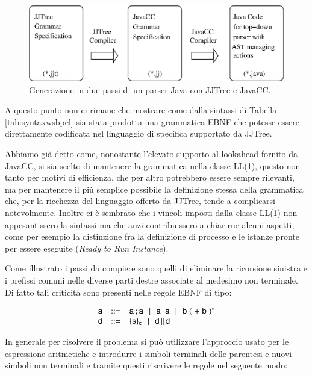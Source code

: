 \begin{figure}[!t]
\begin{center}
  \includegraphics[scale=0.95]{linguaggio/dia/jjporc}
   \caption[Un parser con JJTree e JavaCC]{Generazione in due passi di un
   parser Java con JJTree e JavaCC.}
  \label{fig:lin:jjproc}
\end{center}
\end{figure}

A questo punto non ci rimane che mostrare come dalla sintassi di Tabella
\ref{tab:syntaxwsbpel} sia stata prodotta una grammatica EBNF che potesse
essere direttamente codificata nel linguaggio di specifica supportato da
JJTree.

Abbiamo già detto come, nonostante l'elevato supporto al lookahead fornito
da JavaCC, si sia scelto di mantenere la grammatica nella classe LL(1), questo
non tanto per motivi di efficienza, che per altro potrebbero essere sempre
rilevanti, ma per mantenere il più semplice possibile la definizione stessa
della grammatica che, per la ricchezza del linguaggio offerto da JJTree, tende
a complicarsi notevolmente. Inoltre ci è sembrato che i vincoli imposti dalla
classe LL(1) non appesantissero la sintassi ma che anzi contribuissero a chiarirne
alcuni aspetti, come per esempio la distinzione fra la definizione di processo
e le istanze pronte per essere eseguite (\emph{Ready to Run Instance}).

Come illustrato i passi da compiere sono quelli di eliminare la ricorsione
sinistra e i prefissi comuni nelle diverse parti destre associate al medesimo
non terminale. Di fatto tali criticità sono presenti nelle regole EBNF di tipo:

$$
\begin{array}{rcl}
\xs & ::= &
\xs \xsucc\xs  
\!\sepgr\! \xs \xpar \xs 
\!\sepgr\! \xb \; ( \; + \; \xb  \; )^*  \\
 
\xd & ::= &  \xeng{\xI}{\xcorr} \!\sepgr\! \xd \, \xspar \xd
\end{array}
$$ 

In generale per risolvere il problema si può utilizzare l'approccio usato per
le espressione aritmetiche e introdurre i simboli terminali delle parentesi e
nuovi simboli non terminali e tramite questi riscrivere le regole nel
seguente modo:

